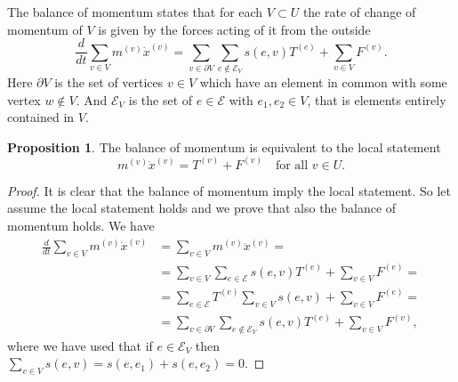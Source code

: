 \documentclass[a4paper,11pt]{article}
\theoremstyle{definition}
\newtheorem{proposition}{Proposition}
\begin{document}
The balance of momentum states that for each $V\subset U$ the rate of change of momentum of $V$ is given by the forces acting of it from the outside
\[
\frac{d}{dt}\sum_{v\in V}m^{(v)}\dot{x}^{(v)}=\sum_{v\in\partial V}\sum_{e\notin\mathscr{E}_V}s(e,v)T^{(e)}+\sum_{v\in V}F^{(v)}.
\]
Here $\partial V$ is the set of vertices $v\in V$ which have an element in common with some vertex $w\notin V$. And $\mathscr{E}_V$ is the set of $e\in\mathscr{E}$ with $e_1,e_2\in V$, that is elements entirely contained in $V$.
\begin{proposition}
\label{prop:balance-momentum}
The balance of momentum is equivalent to the local statement
\[
m^{(v)}\ddot{x}^{(v)}=T^{(v)}+F^{(v)}\quad\text{for all $v\in U$}.
\]
\end{proposition}
\begin{proof}
It is clear that the balance of momentum imply the local statement. So let assume the local statement holds and we prove that also the balance of momentum holds. We have
\begin{align*}
\frac{d}{dt}\sum_{v\in V}m^{(v)}\dot{x}^{(v)}&=\sum_{v\in V}m^{(v)}\ddot{x}^{(v)}= \\
&=\sum_{v\in V}\sum_{e\in\mathscr{E}}s(e,v)T^{(e)}+\sum_{v\in V}F^{(e)}= \\
&=\sum_{e\in\mathscr{E}}T^{(e)}\sum_{v\in V}s(e,v)+\sum_{v\in V}F^{(e)}=\\
&=\sum_{v\in\partial V}\sum_{e\notin\mathscr{E}_V}s(e,v)T^{(e)}+\sum_{v\in V}F^{(v)},
\end{align*}
where we have used that if $e\in\mathscr{E}_V$ then $\sum_{v\in V}s(e,v)=s(e,e_1)+s(e,e_2)=0$.
\end{proof}
\end{document}
